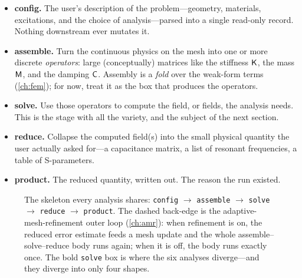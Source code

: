 \begin{itemize}[nosep]
  \item \textbf{config.} The user's description of the problem---geometry,
  materials, excitations, and the choice of analysis---parsed into a single
  read-only record. Nothing downstream ever mutates it.
  \item \textbf{assemble.} Turn the continuous physics on the mesh into one or
  more discrete \emph{operators}: large (conceptually) matrices like the
  stiffness $\mathsf{K}$, the mass $\mathsf{M}$, and the damping $\mathsf{C}$. Assembly is a
  \emph{fold} over the weak-form terms (\cref{ch:fem}); for now, treat it as the
  box that produces the operators.
  \item \textbf{solve.} Use those operators to compute the field, or fields, the
  analysis needs. This is the stage with all the variety, and the subject of
  the next section.
  \item \textbf{reduce.} Collapse the computed field(s) into the small physical
  quantity the user actually asked for---a capacitance matrix, a list of
  resonant frequencies, a table of S-parameters.
  \item \textbf{product.} The reduced quantity, written out. The reason the run
  existed.
\end{itemize}

\begin{figure}[t]
\centering
{}
\caption[The skeleton]{The skeleton every analysis shares:
\texttt{config} $\to$ \texttt{assemble} $\to$ \texttt{solve} $\to$
\texttt{reduce} $\to$ \texttt{product}.
The dashed back-edge is the adaptive-mesh-refinement outer loop
(\cref{ch:amr}): when refinement is on, the reduced error estimate feeds a mesh
update and the whole assemble--solve--reduce body runs again; when it is off,
the body runs exactly once. The bold \texttt{solve} box is where the six
analyses diverge---and they diverge into only four shapes.}
\label{fig:skeleton}
\end{figure}

